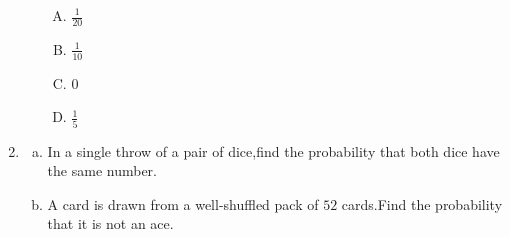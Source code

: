 \documentclass{article}
\begin{document}
\begin{enumerate}
\begin{enumerate}[(i)]
\begin{enumerate}[(A)]                            \item $\frac{1}{20}$                      \item $\frac{1}{10}$                      \item $0$                                 \item $\frac{1}{5}$               \end{enumerate}
\end{enumerate}
\item \begin{enumerate}[(a)]
\item In a single throw of a pair of dice,find the probability that both dice have the same number.
\item A card is drawn from a well-shuffled pack of $52$ cards.Find the probability that it is not an ace.
\end{enumerate}
\end{enumerate}
\end{document}
